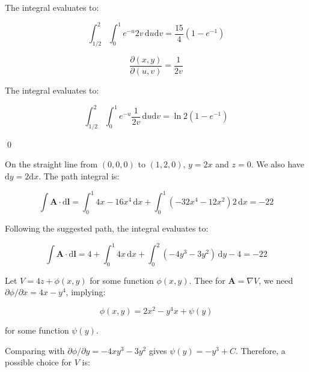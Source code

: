 \documentclass[12pt]{article}
\begin{document}
The integral evaluates to:

\begin{equation}
    \int_{1/2}^{2} \int_{0}^{1} e^{-u} 2v \, \mathrm{d}u \mathrm{d}v = \frac{15}{4} (1 - e^{-1})
\end{equation}

\begin{correction}
    \begin{equation}
        \frac{\partial (x, y)}{\partial (u, v)} = \frac{1}{2v}
    \end{equation}

    The integral evaluates to:

    \begin{equation}
        \int_{1/2}^{2} \int_{0}^{1} e^{-u} \frac{1}{2v} \, \mathrm{d}u \mathrm{d}v = \ln{2} (1 - e^{-1})
    \end{equation}
\end{correction}
\qed



On the straight line from $(0, 0, 0)$ to $(1, 2, 0)$, $y = 2x$ and $z = 0$. We also have $\mathrm{d}y = 2\mathrm{d}x$. The path integral is:

\begin{equation}
    \int \mathbf{A} \cdot \mathrm{d}\mathbf{l} = \int_{0}^{1} 4x - 16x^{4} \, \mathrm{d}x + \int_{0}^{1} (-32x^{4} - 12x^{2}) 2 \, \mathrm{d}x = -22
\end{equation}

Following the suggested path, the integral evaluates to:

\begin{equation}
    \int \mathbf{A} \cdot \mathrm{d}\mathbf{l} = 4 + \int_{0}^{1} 4x \, \mathrm{d}x + \int_{0}^{2} (-4y^{3} - 3y^{2}) \, \mathrm{d}y - 4 = -22
\end{equation}

Let $V = 4z + \phi(x, y)$ for some function $\phi(x, y)$. Thee for $\mathbf{A} = \nabla V$, we need $\partial \phi/\partial x = 4x - y^{4}$, implying:

\begin{equation}
    \phi(x, y) = 2x^{2} - y^{4}x + \psi(y)
\end{equation}

for some function $\psi(y)$.

Comparing with $\partial \phi/\partial y = -4xy^{3} - 3y^{2}$ gives $\psi(y) = -y^{3} + C$. Therefore, a possible choice for $V$ is:
\end{document}
